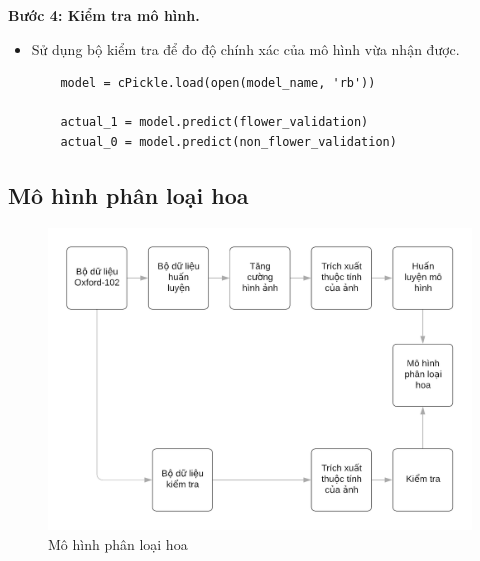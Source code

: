 \documentclass[12pt]{report}
\begin{document}
		\textbf{Bước 4: Kiểm tra mô hình.} 
		
		\begin{itemize}
			\item Sử dụng bộ kiểm tra để đo độ chính xác của mô hình vừa nhận được.
			
		\begin{lstlisting}
    model = cPickle.load(open(model_name, 'rb'))
    
    actual_1 = model.predict(flower_validation)
    actual_0 = model.predict(non_flower_validation)
    		\end{lstlisting}
	
		\end{itemize}
		
		
    		
    		
		
										
										
		
		\subsection{Mô hình phân loại hoa}
		\begin{figure}[h]
			\centering
			\includegraphics[scale=0.4]{mohinh_phanloai}
			\caption{Mô hình phân loại hoa}
			\label{fig:mohinh_phanloai}
		\end{figure}
										
\end{document}
